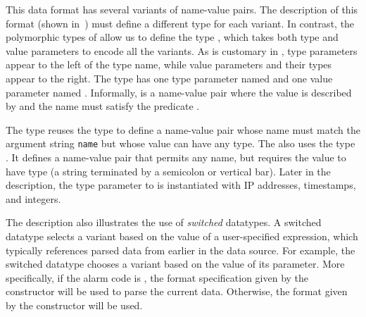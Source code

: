 This data format has several variants of name-value pairs. The
\padsc{} description of this format (shown in~)
must define a different type for each variant. In contrast, the
polymorphic types of \padsml{} allow us to define the type ,
which takes both type and value parameters to encode all the
variants. As is customary in \ml{},  type parameters appear to the left of the type name, while value parameters and their \ml{} types appear to
the right.  The type has
one type parameter named  and one value parameter named
.  Informally,  is a name-value pair where the
value is described by  and the name must satisfy the
predicate .

The  type reuses the type to define a name-value pair whose name must match the argument string \texttt{name} but whose value can have any type. 
The  also uses the type . It defines a name-value pair that permits any name, but requires the value to have type  (a string terminated by a semicolon or vertical bar).  Later in the description, the type parameter to  is instantiated with IP addresses, timestamps, and integers.


The \darkstar{} description also illustrates the use of
\textit{switched} datatypes.  A switched datatype selects a variant
based on the value of a user-specified \ocaml{} expression, which
typically references parsed data from earlier in the data source.  For
example, the switched datatype  chooses a
variant based on the value of its  parameter.  More
specifically, if the alarm code is , the format specification
given by the  constructor will be used to parse the
current data.  Otherwise, the format given by the 
constructor will be used.

